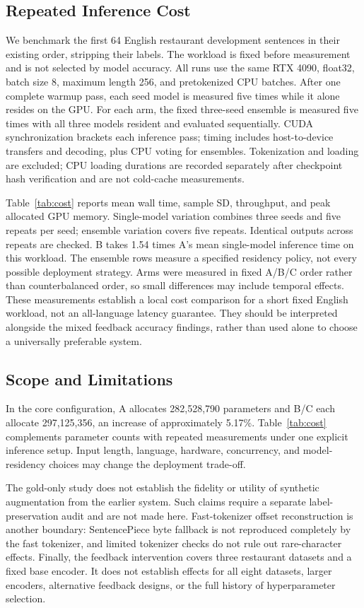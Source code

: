 \documentclass[conference]{IEEEtran}
\begin{document}
\subsection{Repeated Inference Cost}

We benchmark the first 64 English restaurant development sentences in their existing order, stripping their labels. The workload is fixed before measurement and is not selected by model accuracy. All runs use the same RTX 4090, float32, batch size 8, maximum length 256, and pretokenized CPU batches. After one complete warmup pass, each seed model is measured five times while it alone resides on the GPU. For each arm, the fixed three-seed ensemble is measured five times with all three models resident and evaluated sequentially. CUDA synchronization brackets each inference pass; timing includes host-to-device transfers and decoding, plus CPU voting for ensembles. Tokenization and loading are excluded; CPU loading durations are recorded separately after checkpoint hash verification and are not cold-cache measurements.

Table~\ref{tab:cost} reports mean wall time, sample SD, throughput, and peak allocated GPU memory. Single-model variation combines three seeds and five repeats per seed; ensemble variation covers five repeats. Identical outputs across repeats are checked. B takes 1.54 times A's mean single-model inference time on this workload. The ensemble rows measure a specified residency policy, not every possible deployment strategy. Arms were measured in fixed A/B/C order rather than counterbalanced order, so small differences may include temporal effects. These measurements establish a local cost comparison for a short fixed English workload, not an all-language latency guarantee. They should be interpreted alongside the mixed feedback accuracy findings, rather than used alone to choose a universally preferable system.

\subsection{Scope and Limitations}
In the core configuration, A allocates 282,528,790 parameters and B/C each allocate 297,125,356, an increase of approximately 5.17\%. Table~\ref{tab:cost} complements parameter counts with repeated measurements under one explicit inference setup. Input length, language, hardware, concurrency, and model-residency choices may change the deployment trade-off.

The gold-only study does not establish the fidelity or utility of synthetic augmentation from the earlier system. Such claims require a separate label-preservation audit and are not made here. Fast-tokenizer offset reconstruction is another boundary: SentencePiece byte fallback is not reproduced completely by the fast tokenizer, and limited tokenizer checks do not rule out rare-character effects. Finally, the feedback intervention covers three restaurant datasets and a fixed base encoder. It does not establish effects for all eight datasets, larger encoders, alternative feedback designs, or the full history of hyperparameter selection.
\end{document}
